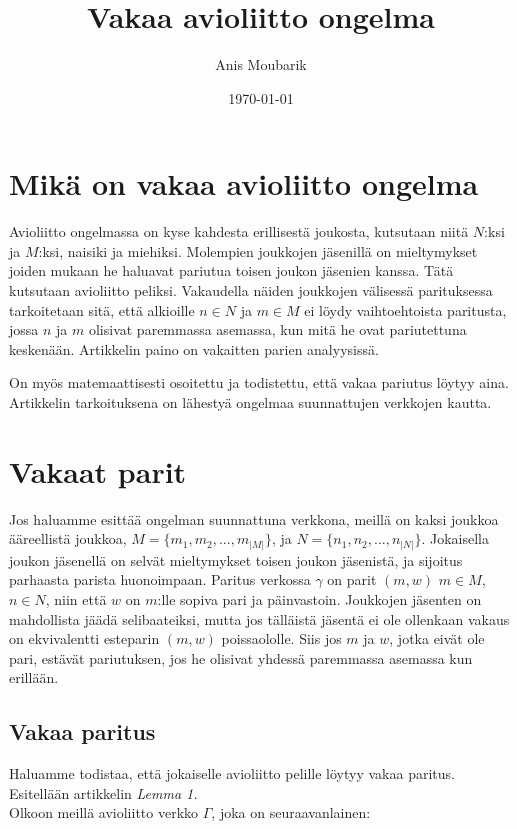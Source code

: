 \documentclass[finnish]{tktltiki2}
\title{Vakaa avioliitto ongelma}
\author{Anis Moubarik}
\date{\today}
\theoremstyle{definition}
\theoremstyle{remark}
\begin{document}

\maketitle        %
\makeabstract     %

\newpage          %



\section{Mikä on vakaa avioliitto ongelma}


Avioliitto ongelmassa on kyse kahdesta erillisestä joukosta, kutsutaan niitä $N$:ksi ja $M$:ksi, naisiki ja miehiksi. Molempien joukkojen jäsenillä on mieltymykset joiden mukaan he haluavat pariutua toisen joukon jäsenien kanssa. Tätä kutsutaan avioliitto peliksi.
Vakaudella näiden joukkojen välisessä parituksessa tarkoitetaan sitä, että alkioille $n \in N$ ja $m \in M$ ei löydy vaihtoehtoista paritusta, jossa $n$ ja $m$ olisivat paremmassa asemassa, kun mitä he ovat pariutettuna keskenään. Artikkelin paino on vakaitten parien analyysissä.

On myös matemaattisesti osoitettu ja todistettu, että vakaa pariutus löytyy aina. Artikkelin tarkoituksena on lähestyä ongelmaa suunnattujen verkkojen kautta.


\section{Vakaat parit}
Jos haluamme esittää ongelman suunnattuna verkkona, meillä on kaksi joukkoa ääreellistä joukkoa, 
$M = \{m_{1}, m_{2},..., m_{|M|}\}$, ja $N = \{n_{1}, n_{2},...,n_{|N|}\}$. Jokaisella joukon jäsenellä on selvät mieltymykset toisen joukon jäsenistä, ja sijoitus parhaasta parista huonoimpaan. Paritus verkossa $\gamma$ on parit $(m, w)$ $m \in M$, $n \in N$, niin että $w$ on $m$:lle sopiva pari ja päinvastoin. Joukkojen jäsenten on mahdollista jäädä selibaateiksi, mutta jos tälläistä jäsentä ei ole ollenkaan vakaus on ekvivalentti esteparin $(m, w)$ poissaololle.
Siis jos $m$ ja $w$, jotka eivät ole pari, estävät pariutuksen, jos he olisivat yhdessä paremmassa asemassa kun erillään.

\subsection{Vakaa paritus}
Haluamme todistaa, että jokaiselle avioliitto pelille löytyy vakaa paritus.
Esitellään artikkelin \emph{Lemma 1.} \\Olkoon meillä avioliitto verkko $\Gamma$, joka on seuraavanlainen:
\\
\end{document}
